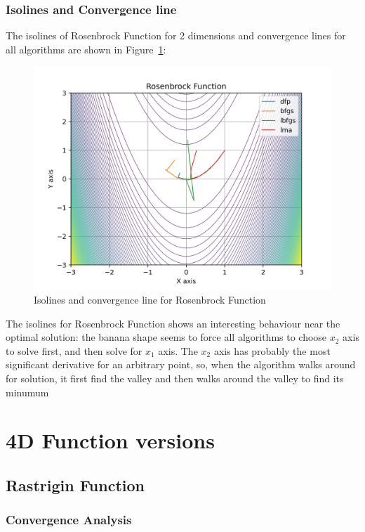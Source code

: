 \documentclass[conference]{IEEEtran}
\begin{document}
\subsubsection{Isolines and Convergence line}
\label{isolinesrosenbrock2d2D}

The isolines of Rosenbrock Function for 2 dimensions and convergence lines for all algorithms are shown in Figure~\ref{fig:rosenbrock2d}:\begin{figure}[H]
\centering
\caption{Isolines and convergence line for Rosenbrock Function}
\label{fig:rosenbrock2d}
\includegraphics[scale=0.5]{images/rosenbrock2d.jpg}
\end{figure}
The isolines for Rosenbrock Function shows an interesting behaviour  near the optimal solution: the banana shape seems to force all algorithms to choose $x_{2}$ axis to solve first, and then solve for $x_{1}$ axis. The $x_{2}$ axis has probably the most significant derivative for an arbitrary point, so, when the algorithm walks around for solution, it first find the valley and then walks around the valley to find its minumum
\section{4D Function versions}
\label{functions4D}

\subsection{Rastrigin Function}
\label{rastrigin4d4D}

\subsubsection{Convergence Analysis}
\label{convergencerastrigin4d4D}
\end{document}
